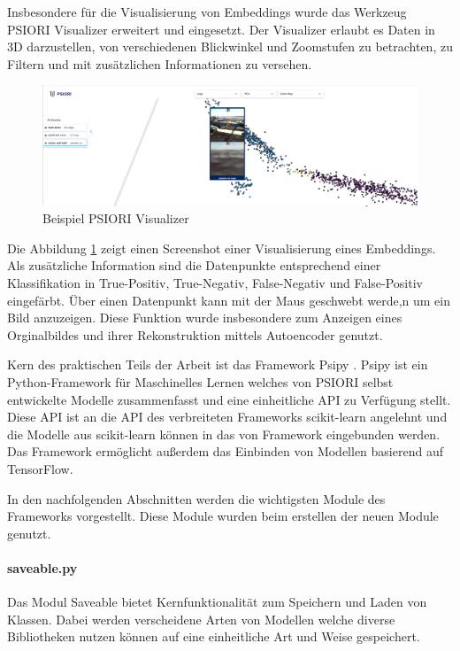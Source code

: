 	Insbesondere für die Visualisierung von Embeddings wurde das Werkzeug PSIORI Visualizer erweitert und eingesetzt. Der Visualizer erlaubt es Daten in 3D darzustellen, von verschiedenen Blickwinkel und Zoomstufen zu betrachten, zu Filtern und mit zusätzlichen Informationen zu versehen. 
	\begin{figure}[h]
		\centering
		\includegraphics[width=1\textwidth, center]{bilder/Grundlagen/Example_Visualizer.png}
		\caption[Beispiel PSIORI Visualizer]{Beispiel PSIORI Visualizer}
		\label{img:ExampleVisualizer}
	\end{figure}  
	Die Abbildung \ref{img:ExampleVisualizer} zeigt einen Screenshot einer Visualisierung eines  Embeddings. Als zusätzliche Information sind die Datenpunkte entsprechend einer Klassifikation in True-Positiv, True-Negativ, False-Negativ und False-Positiv eingefärbt. Über einen Datenpunkt kann mit der Maus geschwebt werde,n um ein Bild anzuzeigen. Diese Funktion wurde insbesondere zum Anzeigen eines Orginalbildes und ihrer Rekonstruktion mittels Autoencoder genutzt. 
	
	Kern des praktischen Teils der Arbeit ist das Framework  Psipy \cite{PSIORIGmbH.2019}.	
	Psipy ist ein Python-Framework für Maschinelles Lernen welches von PSIORI selbst entwickelte Modelle zusammenfasst und eine einheitliche API zu Verfügung stellt. Diese API ist an die API des verbreiteten Frameworks scikit-learn angelehnt und die Modelle aus scikit-learn können in das von Framework eingebunden werden. Das Framework ermöglicht außerdem das Einbinden von Modellen basierend auf TensorFlow.

	
	In den nachfolgenden Abschnitten werden die wichtigsten Module des Frameworks vorgestellt. Diese Module wurden beim erstellen der neuen Module genutzt.
	
	 \paragraph{saveable.py} Das Modul Saveable bietet Kernfunktionalität zum Speichern und Laden von Klassen. Dabei werden verscheidene Arten von Modellen welche diverse Bibliotheken nutzen können auf eine einheitliche Art und Weise gespeichert. 

